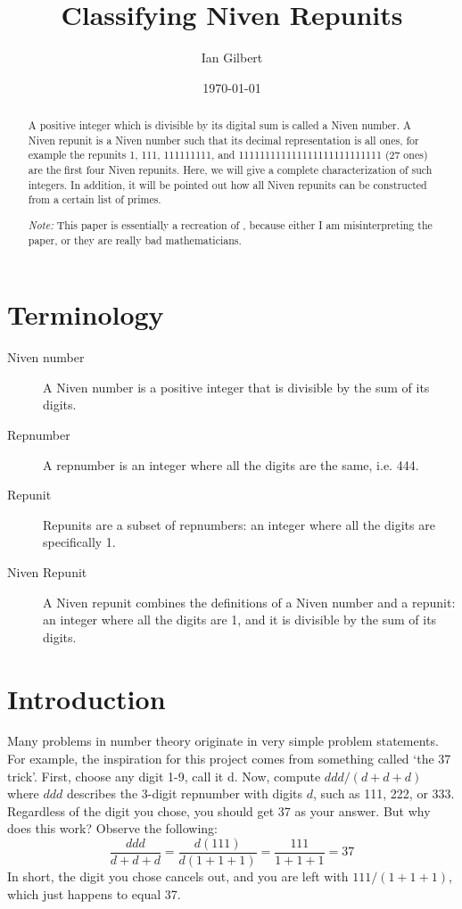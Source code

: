 \documentclass{amsart}
\begin{document}
\title{Classifying Niven Repunits}
\author{Ian Gilbert}
\date{\today}

\begin{abstract}
A positive integer which is divisible by its digital sum is called a Niven number. A Niven repunit is a Niven number such that its decimal representation is all ones, for example the repunits 1, 111, 111111111, and 111111111111111111111111111 (27 ones) are the first four Niven repunits. Here, we will give a complete characterization of such integers. In addition, it will be pointed out how all Niven repunits can be constructed from a certain list of primes.

\textit{Note:} This paper is essentially a recreation of \cite{nivenrepunits}, because either I am misinterpreting the paper, or they are really bad mathematicians.
\end{abstract}

\maketitle

\section*{Terminology}

\begin{description}
\item[Niven number] A Niven number is a positive integer that is divisible by the sum of its digits.
\item[Repnumber] A repnumber is an integer where all the digits are the same, i.e. 444.
\item[Repunit] Repunits are a subset of repnumbers: an integer where all the digits are specifically 1.
\item[Niven Repunit] A Niven repunit combines the definitions of a Niven number and a repunit: an integer where all the digits are 1, and it is divisible by the sum of its digits.
\end{description}

\section{Introduction}

Many problems in number theory originate in very simple problem statements. For example, the inspiration for this project comes from something called `the 37 trick'. First, choose any digit 1-9, call it d. Now, compute $ddd/(d+d+d)$ where $ddd$ describes the 3-digit repnumber with digits $d$, such as 111, 222, or 333. Regardless of the digit you chose, you should get 37 as your answer. But why does this work? Observe the following: \[\frac{ddd}{d+d+d}=\frac{d(111)}{d(1+1+1)}=\frac{111}{1+1+1}=37\] In short, the digit you chose cancels out, and you are left with $111/(1+1+1)$, which just happens to equal 37.
\end{document}
